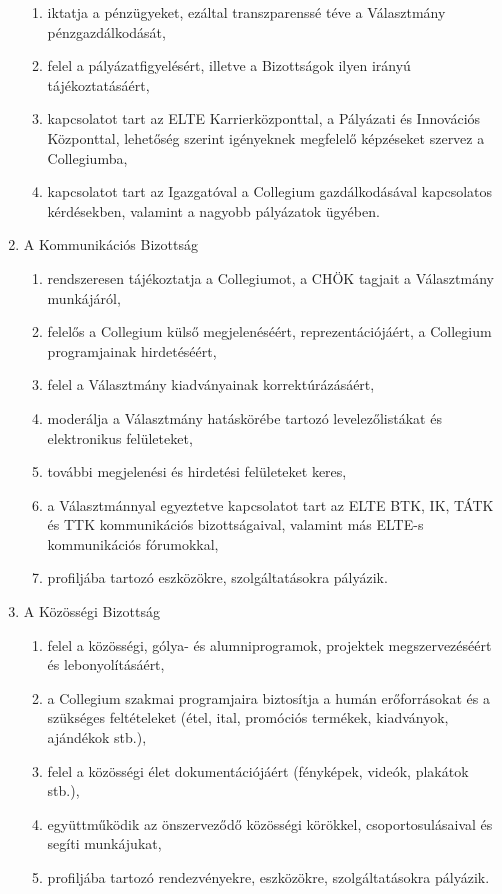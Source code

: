 \documentclass{rulebook}
\begin{document}
\begin{enumerate}
\begin{enumerate}
		\item  iktatja a pénzügyeket, ezáltal transzparenssé téve a Választmány pénzgazdálkodását,
		\item  felel a pályázatfigyelésért, illetve a Bizottságok ilyen irányú tájékoztatásáért,
		\item  kapcsolatot tart az ELTE Karrierközponttal, a Pályázati és Innovációs Központtal, lehetőség szerint igényeknek megfelelő képzéseket szervez a Collegiumba,
		\item  kapcsolatot tart az Igazgatóval a Collegium gazdálkodásával kapcsolatos kérdésekben, valamint a nagyobb pályázatok ügyében.
		\end{enumerate}
	\item  A Kommunikációs Bizottság
	\begin{enumerate}	
		\item 	rendszeresen tájékoztatja a Collegiumot, a CHÖK tagjait a Választmány munkájáról,
		\item 	felelős a Collegium külső megjelenéséért, reprezentációjáért, a Collegium programjainak hirdetéséért,
		\item 	felel a Választmány kiadványainak korrektúrázásáért,
		\item 	moderálja a Választmány hatáskörébe tartozó levelezőlistákat és elektronikus felületeket,
		\item 	további megjelenési és hirdetési felületeket keres,
		\item 	a Választmánnyal egyeztetve kapcsolatot tart az ELTE BTK, IK, TÁTK és TTK kommunikációs bizottságaival, valamint más ELTE-s kommunikációs fórumokkal,
		\item 	profiljába tartozó eszközökre, szolgáltatásokra pályázik.
	\end{enumerate}
	\item  A Közösségi Bizottság
	\begin{enumerate}	
		\item felel a közösségi, gólya- és alumniprogramok, projektek megszervezéséért és lebonyolításáért,
		\item 	a Collegium szakmai programjaira biztosítja a humán erőforrásokat és a szükséges feltételeket (étel, ital, promóciós termékek, kiadványok, ajándékok stb.),
		\item felel a közösségi élet dokumentációjáért (fényképek, videók, plakátok stb.),
		\item együttműködik az önszerveződő közösségi körökkel, csoportosulásaival és segíti munkájukat,
		\item profiljába tartozó rendezvényekre, eszközökre, szolgáltatásokra pályázik.

\end{enumerate}
\end{enumerate}
\end{document}
